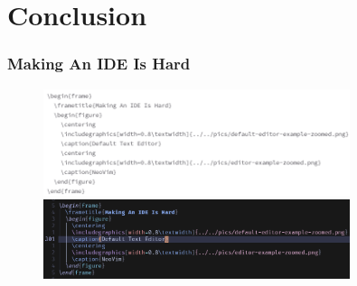 \documentclass{beamer}
\begin{document}
\section{Conclusion}
\SectionPage

\begin{frame}
  \frametitle{Making An IDE Is Hard}
  \begin{figure}
    \centering
    \includegraphics[width=0.8\textwidth]{../../pics/default-editor-example-zoomed.png}
    \centering
    \includegraphics[width=0.8\textwidth]{../../pics/editor-example-zoomed.png}
  \end{figure}
\end{frame}
\end{document}
